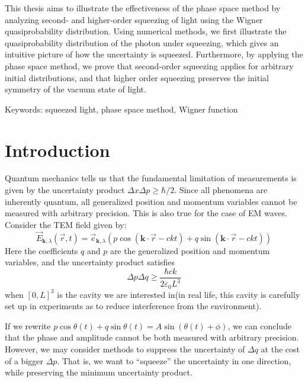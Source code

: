 \documentclass[10pt,a4paper]{report}
\def\paperenglishkeywords{squeezed light, phase space method, Wigner function} %
\begin{document}
This thesis aims to illustrate the effectiveness of the phase space method by analyzing second- and higher-order squeezing of light using the Wigner quasiprobability distribution. Using numerical methods, we first illustrate the quasiprobability distribution of the photon under squeezing, which gives an intuitive picture of how the uncertainty is squeezed. Furthermore, by applying the phase space method, we prove that second-order squeezing applies for arbitrary initial distributions, and that higher order squeezing preserves the initial symmetry of the vacuum state of light.

\vfill
Keywords: \paperenglishkeywords

{ %
\renewcommand\baselinestretch{1.3}
\tableofcontents
\listoffigures
}

\chapter{Introduction}\label{chap:introduction}
Quantum mechanics tells us that the fundamental limitation of measurements is given by the uncertainty product $\Delta x\Delta p\ge\hbar/2$.
Since all phenomena are inherently quantum, all generalized position and momentum variables cannot be measured with arbitrary precision.
This is also true for the case of EM waves. Consider the TEM field given by:
\begin{equation}
  \vec{E}_{\mathbf{k},\lambda}(\vec{r},t)=\vec{e}_{\mathbf{k},\lambda}(p\cos{(\mathbf{k}\cdot\vec{r}-ckt)}+q\sin{(\mathbf{k}\cdot\vec{r}-ckt)})
\end{equation}
Here the coefficients $q$ and $p$ are the generalized position and momentum variables, and the uncertainty product satisfies
\begin{equation}
  \Delta p\Delta q \ge \frac{\hbar ck}{2\varepsilon_{0}L^{3}}
\end{equation}
when $[0,L]^{3}$ is the cavity we are interested in(in real life, this cavity is carefully set up in experiments as to reduce interference from the environment).

If we rewrite $p\cos{\theta(t)}+q\sin{\theta(t)}=A\sin{(\theta(t)+\phi)}$, we can conclude that the phase and amplitude cannot be both measured with arbitrary precision.
However, we may consider methods to suppress the uncertainty of $\Delta q$ at the cost of a bigger $\Delta p$.
That is, we want to ``squeeze'' the uncertainty in one direction, while preserving the minimum uncertainty product.
\end{document}
